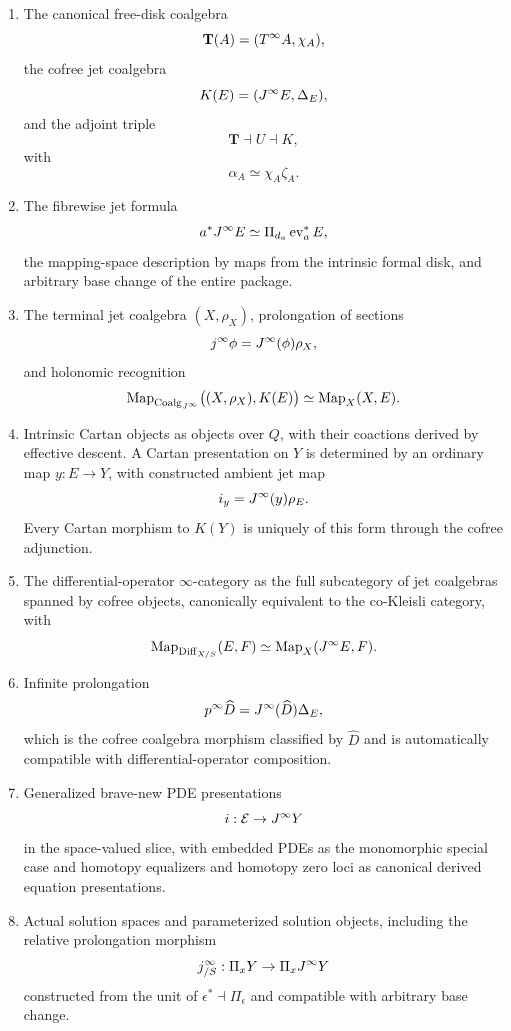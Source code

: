 \begin{theorem}
\begin{enumerate}
\item The canonical free-disk coalgebra
\[
    \mathbf T(A)=(T^{\infty} A,\chi_A),
\]
the cofree jet coalgebra
\[
    K(E)=(J^{\infty} E,\Delta_E),
\]
and the adjoint triple
\[
    \mathbf T\dashv U\dashv K,
\]
with
\[
    \alpha_A\simeq\chi_A\zeta_A.
\]

\item The fibrewise jet formula
\[
    a^*J^{\infty} E\simeq\Pi_{d_a}\operatorname{ev}_a^*E,
\]
the mapping-space description by maps from the intrinsic formal disk, and arbitrary base change of the entire package.

\item The terminal jet coalgebra $(X,\rho_X)$, prolongation of sections
\[
    j^\infty\phi=J^{\infty}(\phi)\rho_X,
\]
and holonomic recognition
\[
    \operatorname{Map}_{\operatorname{Coalg}_{J^{\infty}}}
    \bigl((X,\rho_X),K(E)\bigr)
    \simeq
    \operatorname{Map}_X(X,E).
\]

\item Intrinsic Cartan objects as objects over $Q$, with their coactions derived by effective descent.  A Cartan presentation on $Y$ is determined by an ordinary map $y:E\to Y$, with constructed ambient jet map
\[
    i_y=J^{\infty}(y)\rho_E.
\]
Every Cartan morphism to $K(Y)$ is uniquely of this form through the cofree adjunction.

\item The differential-operator $\infty$-category as the full subcategory of jet coalgebras spanned by cofree objects, canonically equivalent to the co-Kleisli category, with
\[
    \operatorname{Map}_{\operatorname{Diff}_{X/S}}(E,F)\simeq\operatorname{Map}_X(J^{\infty} E,F).
\]

\item Infinite prolongation
\[
    p^\infty\widehat D
    =
    J^{\infty}(\widehat D)\Delta_E,
\]
which is the cofree coalgebra morphism classified by $\widehat D$ and is automatically compatible with differential-operator composition.

\item Generalized brave-new PDE presentations
\[
    i:\mathcal E\to J^{\infty} Y
\]
in the space-valued slice, with embedded PDEs as the monomorphic special case and homotopy equalizers and homotopy zero loci as canonical derived equation presentations.

\item Actual solution spaces and parameterized solution objects, including the relative prolongation morphism
\[
    j^\infty_{/S}:\Pi_xY\to\Pi_xJ^{\infty} Y
\]
constructed from the unit of $\epsilon^*\dashv\Pi_\epsilon$ and compatible with arbitrary base change.


\end{enumerate}
\end{theorem}
